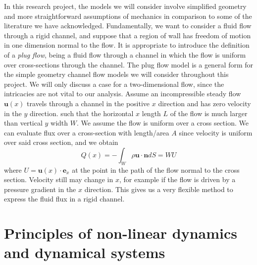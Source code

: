 \documentclass{report}
\begin{document}
In this research project, the models we will consider involve simplified geometry and more straightforward assumptions of mechanics in comparison to some of the literature we have acknowledged.
Fundamentally, we want to consider a fluid flow through a rigid channel, and suppose that a region of wall has freedom of motion in one dimension normal to the flow.
It is appropriate to introduce the definition of a \textit{plug flow}, being a fluid flow through a channel in which the flow is uniform over cross-sections through the channel.
The plug flow model is a general form for the simple geometry channel flow models we will consider throughout this project.
We will only discuss a case for a two-dimensional flow, since the intricacies are not vital to our analysis.
Assume an incompressible steady flow \(\mathbf{u}(x)\) travels through a channel in the positive $x$ direction and has zero velocity in the $y$ direction.
such that the horizontal $x$ length $L$ of the flow is much larger than vertical $y$ width $W$.
We assume the flow is uniform over a cross section.
We can evaluate flux over a cross-section with length/area $A$
since velocity is uniform over said cross section, and we obtain
\begin{equation}
	Q(x) = -\int_W \rho \mathbf{u}\cdot \mathbf{n} dS = WU
\end{equation}
where $U = \mathbf{u}(x) \cdot \mathbf{e}_x $ at the point in the path of the flow normal to the cross section.
Velocity still may change in $x$, for example if the flow is driven by a pressure gradient in the $x$ direction.
This gives us a very flexible method to express the fluid flux in a rigid channel.

\section{Principles of non-linear dynamics and dynamical systems}
\end{document}
